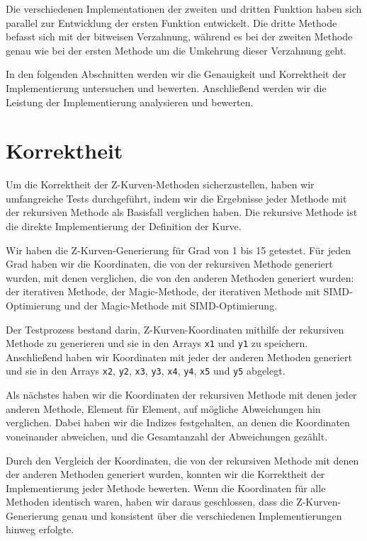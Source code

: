 \documentclass[course=erap]{aspdoc}
\begin{document}
\noindent Die verschiedenen Implementationen der zweiten und dritten Funktion haben sich parallel zur Entwicklung der ersten Funktion entwickelt. Die dritte Methode befasst sich mit der bitweisen Verzahnung, während es bei der zweiten Methode genau wie bei der ersten Methode um die Umkehrung dieser Verzahnung geht.

\noindent In den folgenden Abschnitten werden wir die Genauigkeit und Korrektheit der Implementierung untersuchen und bewerten. Anschließend werden wir die Leistung der Implementierung analysieren und bewerten.
\setlength{\parskip}{1em}

\section{Korrektheit}

\noindent Um die Korrektheit der Z-Kurven-Methoden sicherzustellen, haben wir umfangreiche Tests durchgeführt, indem wir die Ergebnisse jeder Methode mit der rekursiven Methode als Basisfall verglichen haben. Die rekursive Methode ist die direkte Implementierung der Definition der Kurve.

\noindent Wir haben die Z-Kurven-Generierung für Grad von 1 bis 15 getestet. Für jeden Grad haben wir die Koordinaten, die von der rekursiven Methode generiert wurden, mit denen verglichen, die von den anderen Methoden generiert wurden: der iterativen Methode, der Magic-Methode, der iterativen Methode mit SIMD-Optimierung und der Magic-Methode mit SIMD-Optimierung.

\noindent Der Testprozess bestand darin, Z-Kurven-Koordinaten mithilfe der rekursiven Methode zu generieren und sie in den Arrays \texttt{x1} und \texttt{y1} zu speichern. Anschließend haben wir Koordinaten mit jeder der anderen Methoden generiert und sie in den Arrays \texttt{x2}, \texttt{y2}, \texttt{x3}, \texttt{y3}, \texttt{x4}, \texttt{y4}, \texttt{x5} und \texttt{y5} abgelegt.

\noindent Als nächstes haben wir die Koordinaten der rekursiven Methode mit denen jeder anderen Methode, Element für Element, auf mögliche Abweichungen hin verglichen. Dabei haben wir die Indizes festgehalten, an denen die Koordinaten voneinander abweichen, und die Gesamtanzahl der Abweichungen gezählt.

\noindent Durch den Vergleich der Koordinaten, die von der rekursiven Methode mit denen der anderen Methoden generiert wurden, konnten wir die Korrektheit der Implementierung jeder Methode bewerten. Wenn die Koordinaten für alle Methoden identisch waren, haben wir daraus geschlossen, dass die Z-Kurven-Generierung genau und konsistent über die verschiedenen Implementierungen hinweg erfolgte.
\end{document}
